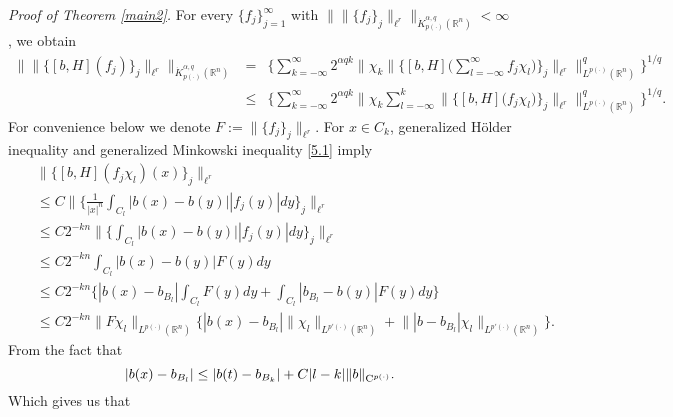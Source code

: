 \documentclass{amse-new}
\numberwithin{equation}{section} %
\begin{document}
\vskip 0.5cm
\noindent
{\it Proof of Theorem \ref{main2}.}
For every $\{f_{j}\}_{j=1}^{\infty}$ with $\|\|\{f_{j}\}_{j}\|_{\ell^{r}}\|_{\dot{K}^{\alpha,q}_{p(\cdot)}(\mathbb{R}^n)}<\infty$, we obtain
\begin{eqnarray*}
\|\|\{[b,H](f_{j})\}_{j}\|_{\ell^{r}}\|_{\dot{K}^{\alpha,q}_{p(\cdot)}(\mathbb{R}^n)}
&=&\bigg\{\sum_{k=-\infty}^{\infty}2^{\alpha q k}\Big\|\chi_{k}\Big\|\Big\{[b,H]\Big(\sum_{l=-\infty}^{\infty}f_{j}\chi_{l}\Big)\Big\}_{j}\Big\|_{\ell^{r}}\Big\|_{L^{p(\cdot)}(\mathbb{R}^n)}^{q}\bigg\}^{1/q}\\
&\leq& \bigg\{\sum_{k=-\infty}^{\infty}2^{\alpha q k}\Big\|\chi_{k}\sum_{l=-\infty}^{k}\Big\|\Big\{[b,H]\Big(f_{j}\chi_{l}\Big)\Big\}_{j}\Big\|_{\ell^{r}}\Big\|_{L^{p(\cdot)}(\mathbb{R}^n)}^{q}\bigg\}^{1/q}.
\end{eqnarray*}
For convenience below we denote $F:=\|\{f_{j}\}_{j}\|_{\ell^{r}}$. For $x\in C_{k}$, generalized H\"{o}lder inequality and generalized Minkowski inequality \eqref{5.1} imply
\begin{eqnarray*}
&&\|\{[b,H](f_{j}\chi_{l})(x)\}_{j}\|_{\ell^{r}}\\
&&\leq C\bigg\|\bigg\{\frac{1}{|x|^n}\int_{C_{l}}|b(x)-b(y)||f_{j}(y)|dy\bigg\}_{j}\bigg\|_{\ell^{r}}\\
&&\leq C2^{-kn}\bigg\|\bigg\{\int_{C_{l}}|b(x)-b(y)||f_{j}(y)|dy\bigg\}_{j}\bigg\|_{\ell^{r}}\\
&&\leq C2^{-kn}\int_{C_{l}}|b(x)-b(y)|F(y)dy\\
&&\leq C2^{-kn}\bigg\{|b(x)-b_{B_{l}}|\int_{C_{l}}F(y)dy+\int_{C_{l}}|b_{B_{l}}-b(y)|F(y)dy\bigg\}\\
&&\leq C2^{-kn}\|F\chi_{l}\|_{L^{p(\cdot)}(\mathbb{R}^n)}\bigg\{|b(x)-b_{B_{l}}|\|\chi_{l}\|_{L^{p'(\cdot)}(\mathbb{R}^n)}
+\Big\||b-b_{B_{l}}|\chi_{l}\Big\|_{L^{p'(\cdot)}(\mathbb{R}^n)}\bigg\}.
\end{eqnarray*}
From the fact that
$$|b(x)-b_{B_{l}}|\leq |b(t)-b_{B_{k}}|+C|l-k|\|b\|_{{\rm C}^{p(\cdot)}}.$$
Which gives us that
\end{document}

